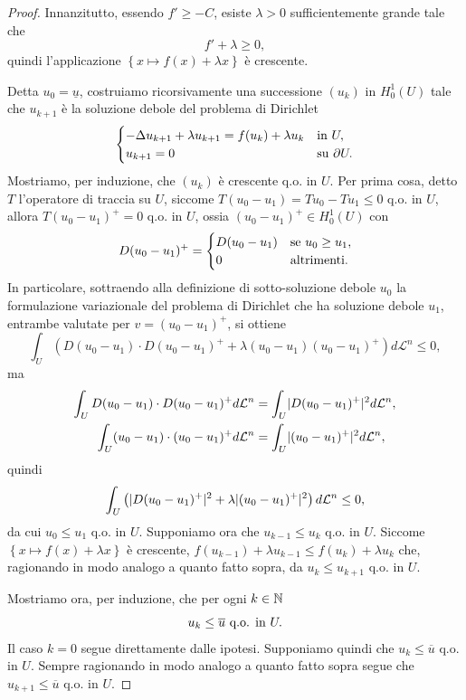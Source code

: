 \begin{proof}
Innanzitutto, essendo $f' \ge -C$, esiste $\lambda >0$ sufficientemente grande tale che 
\[ f' + \lambda \ge 0, \]
quindi l'applicazione $\left\lbrace x \mapsto f(x) + \lambda x\right\rbrace$ è crescente.

Detta $u_0 = \underline{u}$, costruiamo ricorsivamente una successione $(u_k)$ in $H^1_0(U)$ tale che $u_{k+1}$ è la soluzione debole del problema di Dirichlet
\[ 	\begin{cases}
	-\Delta u_{k+1} + \lambda u_{k+1} = f(u_k) + \lambda u_k & \textup{in } U,\\
	u_{k+1} = 0 & \textup{su } \partial U.
\end{cases} \]
Mostriamo, per induzione, che $(u_k)$ è crescente q.o. in $U$. Per prima cosa, detto $T$ l'operatore di traccia su $U$, siccome $T(u_0-u_1) = Tu_0 - Tu_1 \le 0$ q.o. in $U$, allora $T(u_0-u_1)^+ = 0$ q.o. in $U$, ossia $(u_0-u_1)^+ \in H^1_0(U)$ con 
\[ D(u_0-u_1)^+ = \begin{cases}
	D(u_0-u_1) & \textup{se } u_0 \ge u_1, \\
	0 & \textup{altrimenti}.
\end{cases} \]
In particolare, sottraendo alla definizione di sotto-soluzione debole $u_0$ la formulazione variazionale del problema di Dirichlet che ha soluzione debole $u_1$, entrambe valutate per $v= (u_0-u_1)^+$, si ottiene
\[ \int_U \left( D(u_0 - u_1) \cdot D(u_0-u_1)^+ + \lambda(u_0-u_1)(u_0-u_1)^+\right)  d\mathcal{L}^n \le 0,\]
ma
\begin{align*}
	\int_U D(u_0-u_1) \cdot D(u_0-u_1)^+ d\mathcal{L}^n &= \int_U \lvert D(u_0-u_1)^+\rvert^2 d\mathcal{L}^n, \\
	 \int_U (u_0-u_1) \cdot (u_0-u_1)^+ d\mathcal{L}^n &= \int_U \lvert(u_0-u_1)^+\rvert^2 d\mathcal{L}^n,
\end{align*}
quindi 
\[ \int_{U} \left( \lvert D(u_0-u_1)^+\rvert^2 + \lambda \lvert(u_0-u_1)^+\rvert^2\right)  d\mathcal{L}^n \le 0, \]
da cui $u_0 \le u_1$ q.o. in $U$. Supponiamo ora che $u_{k-1} \le u_k$ q.o. in $U$. Siccome $\left\lbrace x \mapsto f(x) + \lambda x\right\rbrace$ è crescente, $f(u_{k-1}) + \lambda u_{k-1} \le f(u_k) + \lambda u_k$ che, ragionando in modo analogo a quanto fatto sopra, da $u_k \le u_{k+1}$ q.o. in $U$.

Mostriamo ora, per induzione, che per ogni $k \in \mathbb{N}$ 
\[ u_k \le \overline{u} \textup{ q.o. in } U. \]
Il caso $k = 0$ segue direttamente dalle ipotesi. Supponiamo quindi che $u_k \le \overline{u}$ q.o. in $U$. Sempre ragionando in modo analogo a quanto fatto sopra segue che $u_{k+1}\le \overline{u}$ q.o. in $U$.


\end{proof}

